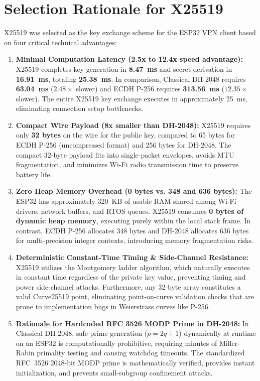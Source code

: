\documentclass[11pt,a4paper]{article}
\begin{document}
\section{Selection Rationale for X25519}

X25519 was selected as the key exchange scheme for the ESP32 VPN client based on four critical technical advantages:

\begin{enumerate}
    \item \textbf{Minimal Computation Latency (2.5x to 12.4x speed advantage):} X25519 completes key generation in \textbf{8.47~ms} and secret derivation in \textbf{16.91~ms}, totaling \textbf{25.38~ms}. In comparison, Classical DH-2048 requires \textbf{63.04~ms} ($2.48\times$ slower) and ECDH P-256 requires \textbf{313.56~ms} ($12.35\times$ slower). The entire X25519 key exchange executes in approximately 25~ms, eliminating connection setup bottlenecks.
    
    \item \textbf{Compact Wire Payload (8x smaller than DH-2048):} X25519 requires only \textbf{32 bytes} on the wire for the public key, compared to 65 bytes for ECDH P-256 (uncompressed format) and 256 bytes for DH-2048. The compact 32-byte payload fits into single-packet envelopes, avoids MTU fragmentation, and minimizes Wi-Fi radio transmission time to preserve battery life.
    
    \item \textbf{Zero Heap Memory Overhead (0 bytes vs. 348 and 636 bytes):} The ESP32 has approximately 320~KB of usable RAM shared among Wi-Fi drivers, network buffers, and RTOS queues. X25519 consumes \textbf{0 bytes of dynamic heap memory}, executing purely within the local stack frame. In contrast, ECDH P-256 allocates 348 bytes and DH-2048 allocates 636 bytes for multi-precision integer contexts, introducing memory fragmentation risks.
    
    \item \textbf{Deterministic Constant-Time Timing \& Side-Channel Resistance:} X25519 utilizes the Montgomery ladder algorithm, which naturally executes in constant time regardless of the private key value, preventing timing and power side-channel attacks. Furthermore, any 32-byte array constitutes a valid Curve25519 point, eliminating point-on-curve validation checks that are prone to implementation bugs in Weierstrass curves like P-256.
    
    \item \textbf{Rationale for Hardcoded RFC 3526 MODP Prime in DH-2048:} In Classical DH-2048, safe prime generation ($p = 2q + 1$) dynamically at runtime on an ESP32 is computationally prohibitive, requiring minutes of Miller-Rabin primality testing and causing watchdog timeouts. The standardized RFC~3526 2048-bit MODP prime is mathematically verified, provides instant initialization, and prevents small-subgroup confinement attacks.
\end{enumerate}
\end{document}
